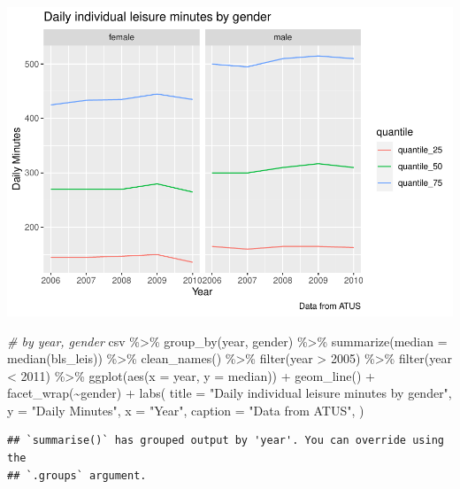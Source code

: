 \documentclass[
]{article}
\newenvironment{Shaded}{\begin{snugshade}}{\end{snugshade}}
\newcommand{\AttributeTok}[1]{\textcolor[rgb]{0.77,0.63,0.00}{#1}}
\newcommand{\CommentTok}[1]{\textcolor[rgb]{0.56,0.35,0.01}{\textit{#1}}}
\newcommand{\DecValTok}[1]{\textcolor[rgb]{0.00,0.00,0.81}{#1}}
\newcommand{\FunctionTok}[1]{\textcolor[rgb]{0.00,0.00,0.00}{#1}}
\newcommand{\NormalTok}[1]{#1}
\newcommand{\SpecialCharTok}[1]{\textcolor[rgb]{0.00,0.00,0.00}{#1}}
\newcommand{\StringTok}[1]{\textcolor[rgb]{0.31,0.60,0.02}{#1}}
\begin{document}
\includegraphics{Paper2_files/figure-latex/graphs-11.pdf}

\begin{Shaded}
\begin{Highlighting}[]
\CommentTok{\# by year, gender}
\NormalTok{csv }\SpecialCharTok{\%\textgreater{}\%}
  \FunctionTok{group\_by}\NormalTok{(year, gender) }\SpecialCharTok{\%\textgreater{}\%}
  \FunctionTok{summarize}\NormalTok{(}\AttributeTok{median =} \FunctionTok{median}\NormalTok{(bls\_leis)) }\SpecialCharTok{\%\textgreater{}\%}
  \FunctionTok{clean\_names}\NormalTok{() }\SpecialCharTok{\%\textgreater{}\%}
  \FunctionTok{filter}\NormalTok{(year }\SpecialCharTok{\textgreater{}} \DecValTok{2005}\NormalTok{) }\SpecialCharTok{\%\textgreater{}\%}
  \FunctionTok{filter}\NormalTok{(year }\SpecialCharTok{\textless{}} \DecValTok{2011}\NormalTok{) }\SpecialCharTok{\%\textgreater{}\%}
  \FunctionTok{ggplot}\NormalTok{(}\FunctionTok{aes}\NormalTok{(}\AttributeTok{x =}\NormalTok{ year, }\AttributeTok{y =}\NormalTok{ median)) }\SpecialCharTok{+}
  \FunctionTok{geom\_line}\NormalTok{() }\SpecialCharTok{+}
  \FunctionTok{facet\_wrap}\NormalTok{(}\SpecialCharTok{\textasciitilde{}}\NormalTok{gender) }\SpecialCharTok{+}
      \FunctionTok{labs}\NormalTok{(}
  \AttributeTok{title =} \StringTok{"Daily individual leisure minutes by gender"}\NormalTok{,}
  \AttributeTok{y =} \StringTok{"Daily Minutes"}\NormalTok{,}
  \AttributeTok{x =} \StringTok{"Year"}\NormalTok{,}
  \AttributeTok{caption =} \StringTok{"Data from ATUS"}\NormalTok{,}
\NormalTok{) }
\end{Highlighting}
\end{Shaded}

\begin{verbatim}
## `summarise()` has grouped output by 'year'. You can override using the
## `.groups` argument.
\end{verbatim}
\end{document}
